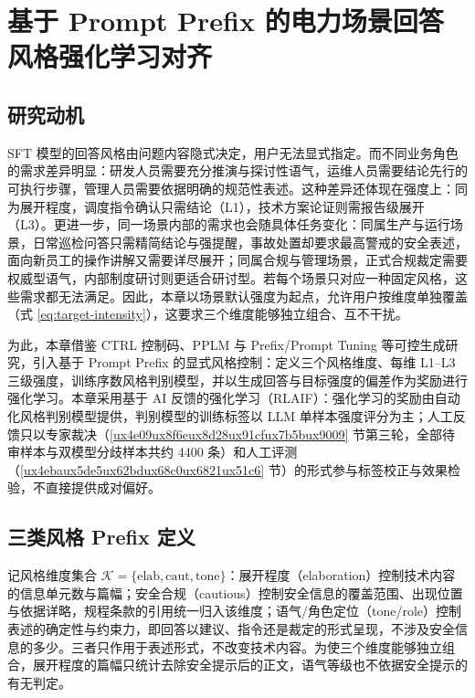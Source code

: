 \documentclass[fontset=fandol,type=master,campus=shenzhen,etitleauto=true]{hithesisbook}
\begin{document}
\chapter{基于 Prompt Prefix 的电力场景回答风格强化学习对齐}\label{ux57faux4e8e-prompt-prefix-ux7684ux7535ux529bux573aux666fux56deux7b54ux98ceux683cux5f3aux5316ux5b66ux4e60ux5bf9ux9f50}

\section{研究动机}\label{ux7814ux7a76ux52a8ux673a-1}

SFT 模型的回答风格由问题内容隐式决定，用户无法显式指定。而不同业务角色的需求差异明显：研发人员需要充分推演与探讨性语气，运维人员需要结论先行的可执行步骤，管理人员需要依据明确的规范性表述。这种差异还体现在强度上：同为展开程度，调度指令确认只需结论（L1），技术方案论证则需报告级展开（L3）。更进一步，同一场景内部的需求也会随具体任务变化：同属生产与运行场景，日常巡检问答只需精简结论与强提醒，事故处置却要求最高警戒的安全表述，面向新员工的操作讲解又需要详尽展开；同属合规与管理场景，正式合规裁定需要权威型语气，内部制度研讨则更适合研讨型。若每个场景只对应一种固定风格，这些需求都无法满足。因此，本章以场景默认强度为起点，允许用户按维度单独覆盖（式 \eqref{eq:target-intensity}），这要求三个维度能够独立组合、互不干扰。

为此，本章借鉴 CTRL 控制码、PPLM 与 Prefix/Prompt Tuning 等可控生成研究\cite{ref36,ref37,ref38,ref39}，引入基于 Prompt Prefix 的显式风格控制：定义三个风格维度、每维 L1--L3 三级强度，训练序数风格判别模型，并以生成回答与目标强度的偏差作为奖励进行强化学习。本章采用基于 AI 反馈的强化学习（RLAIF）\cite{ref89,ref90}：强化学习的奖励由自动化风格判别模型提供，判别模型的训练标签以 LLM 单样本强度评分为主；人工反馈只以专家裁决（\ref{ux4e09ux8f6eux8d28ux91cfux7b5bux9009} 节第三轮，全部待审样本与双模型分歧样本共约 4400 条）和人工评测（\ref{ux4ebaux5de5ux62bdux68c0ux6821ux51c6} 节）的形式参与标签校正与效果检验，不直接提供成对偏好。

\section{三类风格 Prefix 定义}\label{ux4e09ux7c7bux98ceux683c-prefix-ux5b9aux4e49}

记风格维度集合 $\mathcal{K} = \{\text{elab}, \text{caut}, \text{tone}\}$：展开程度（elaboration）控制技术内容的信息单元数与篇幅；安全合规（cautious）控制安全信息的覆盖范围、出现位置与依据详略，规程条款的引用统一归入该维度；语气/角色定位（tone/role）控制表述的确定性与约束力，即回答以建议、指令还是裁定的形式呈现，不涉及安全信息的多少。三者只作用于表述形式，不改变技术内容。为使三个维度能够独立组合，展开程度的篇幅只统计去除安全提示后的正文，语气等级也不依据安全提示的有无判定。
\end{document}
